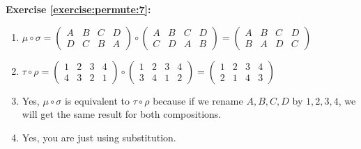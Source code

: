 \noindent\textbf{Exercise \ref{exercise:permute:7}:}
\begin{enumerate}[{a.}]
\item
$\mu\circ\sigma=\begin{pmatrix}
A & B & C & D\\
D & C & B & A
\end{pmatrix}\circ\begin{pmatrix}
A & B & C & D\\
C & D & A & B
\end{pmatrix}=\begin{pmatrix}
A & B & C & D\\
B & A & D & C
\end{pmatrix}$

\item
$\tau\circ\rho=\begin{pmatrix}
1 & 2 & 3 & 4\\
4 & 3 & 2 & 1
\end{pmatrix}\circ\begin{pmatrix}
1 & 2 & 3 & 4\\
3 & 4 & 1 & 2
\end{pmatrix}=\begin{pmatrix}
1 & 2 & 3 & 4\\
2 & 1 & 4 & 3
\end{pmatrix}$

\item
Yes, $\mu\circ\sigma$ is equivalent to $\tau\circ\rho$ because if we rename $A, B, C, D$ by $1, 2, 3, 4$, we will get the same result for both compositions.

\item
Yes, you are just using substitution.
\end{enumerate}

